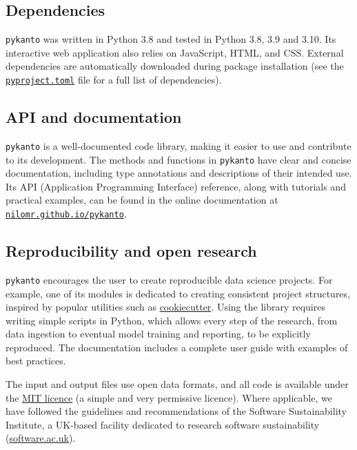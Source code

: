 \subsection{Dependencies}

\texttt{pykanto} was written in Python 3.8 and tested in Python 3.8, 3.9 and
3.10. Its interactive web application also relies on JavaScript, HTML, and CSS.
External dependencies are automatically downloaded during package installation
(see the
\href{https://github.com/nilomr/pykanto/blob/main/pyproject.toml}{\texttt{pyproject.toml}}
file for a full list of dependencies).

\subsection{API and documentation}

\texttt{pykanto} is a well-documented code library, making it easier to use and
contribute to its development. The methods and functions in \texttt{pykanto} have clear
and concise documentation, including type annotations and descriptions of their
intended use. Its API (Application Programming Interface) reference, along with
tutorials and practical examples, can be found in the online documentation
at \href{https://nilomr.github.io/pykanto}{\nolinkurl{nilomr.github.io/pykanto}}.

\subsection{Reproducibility and open research}

\texttt{pykanto} encourages the user to create reproducible data science
projects. For example, one of its modules is dedicated to creating consistent
project structures, inspired by popular utilities such as
\href{https://github.com/cookiecutter/cookiecutter}{cookiecutter}. Using the
library requires writing simple scripts in Python, which allows every step of
the research, from data ingestion to eventual model training and reporting, to be
explicitly reproduced. The documentation includes a complete user guide with
examples of best practices.

The input and output files use open data formats, and all code is available
under the \href{https://choosealicense.com/licenses/mit/}{MIT licence} (a simple
and very permissive licence). Where applicable, we have followed the guidelines
and recommendations of the Software Sustainability Institute, a UK-based
facility dedicated to research software sustainability
(\href{https://www.software.ac.uk/}{software.ac.uk}).



